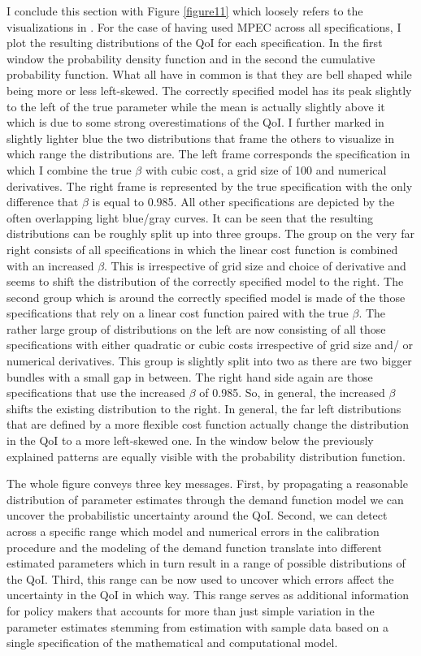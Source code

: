 I conclude this section with Figure \ref{figure11} which loosely refers to the visualizations in \cite{Oberkampf.2010}. For the case of having used MPEC across all specifications, I plot the resulting distributions of the QoI for each specification. In the first window the probability density function and in the second the cumulative probability function. What all have in common is that they are bell shaped while being more or less left-skewed. The correctly specified model has its peak slightly to the left of the true parameter while the mean is actually slightly above it which is due to some strong overestimations of the QoI. I further marked in slightly lighter blue the two distributions that frame the others to visualize in which range the distributions are. The left frame corresponds the specification in which I combine the true $\beta$ with cubic cost, a grid size of 100 and numerical derivatives. The right frame is represented by the true specification with the only difference that $\beta$ is equal to 0.985. All other specifications are depicted by the often overlapping light blue/gray curves. It can be seen that the resulting distributions can be roughly split up into three groups. The group on the very far right consists of all specifications in which the linear cost function is combined with an increased $\beta$. This is irrespective of grid size and choice of derivative and seems to shift the distribution of the correctly specified model to the right. The second group which is around the correctly specified model is made of the those specifications that rely on a linear cost function paired with the true $\beta$. The rather large group of distributions on the left are now consisting of all those specifications with either quadratic or cubic costs irrespective of grid size and/ or numerical derivatives. This group is slightly split into two as there are two bigger bundles with a small gap in between. The right hand side again are those specifications that use the increased $\beta$ of 0.985. So, in general, the increased $\beta$ shifts the existing distribution to the right. In general, the far left distributions that are defined by a more flexible cost function actually change the distribution in the QoI to a more left-skewed one. In the window below the previously explained patterns are equally visible with the probability distribution function.

The whole figure conveys three key messages. First, by propagating a reasonable distribution of parameter estimates through the demand function model we can uncover the probabilistic uncertainty around the QoI. Second, we can detect across a specific range which model and numerical errors in the calibration procedure and the modeling of the demand function translate into different estimated parameters which in turn result in a range of possible distributions of the QoI. Third, this range can be now used to uncover which errors affect the uncertainty in the QoI in which way. This range serves as additional information for policy makers that accounts for more than just simple variation in the parameter estimates stemming from estimation with sample data based on a single specification of the mathematical and computational model.

